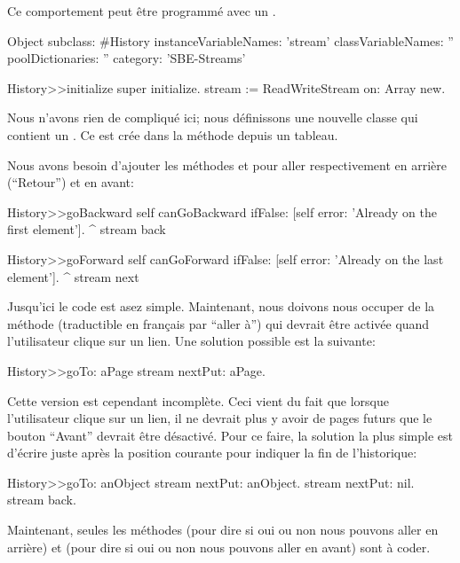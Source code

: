 \documentclass[a4paper,10pt,twoside]{book}
\begin{document}
Ce comportement peut \^etre programm\'e avec un .

\begin{code}{}
Object subclass: #History
  instanceVariableNames: 'stream'
  classVariableNames: ''
  poolDictionaries: ''
  category: 'SBE-Streams'

History>>initialize
    super initialize.
    stream := ReadWriteStream on: Array new.
\end{code}

Nous n'avons rien de compliqu\'e ici; nous d\'efinissons une nouvelle classe
qui contient un \stream. Ce \stream est cr\'ee dans la m\'ethode  
depuis un tableau.

Nous avons besoin d'ajouter les m\'ethodes  et  pour aller respectivement en arri\`ere (``Retour'') et en avant:

\begin{code}{}
History>>goBackward
  self canGoBackward ifFalse: [self error: 'Already on the first element'].
  ^ stream back

History>>goForward
  self canGoForward ifFalse: [self error: 'Already on the last element'].
  ^ stream next
\end{code}

Jusqu'ici le code est asez simple. Maintenant, nous doivons nous occuper
de la m\'ethode  (traductible en fran\c{c}ais par ``aller \`a'') qui devrait \^etre activ\'ee quand l'utilisateur
clique sur un lien. Une solution possible est la suivante:

\begin{code}{}
History>>goTo: aPage
    stream nextPut: aPage.
\end{code}

Cette version est cependant incompl\`ete. Ceci vient du fait que lorsque l'utilisateur clique sur un lien, il ne devrait plus y avoir de pages futurs \ie
que le bouton ``Avant'' devrait \^etre d\'esactiv\'e.
Pour ce faire, la solution la plus simple est d'\'ecrire 
juste apr\`es la position courante pour indiquer la fin de l'historique:

\begin{code}{}
History>>goTo: anObject
  stream nextPut: anObject.
  stream nextPut: nil.
  stream back.
\end{code}

Maintenant, seules les m\'ethodes  (pour dire si oui ou non nous pouvons aller en arri\`ere) et  (pour dire si oui ou non nous pouvons aller en avant) sont \`a coder.
\end{document}
